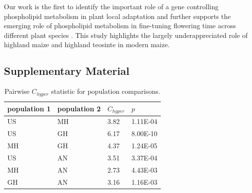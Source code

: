 Our work is the first to identify the important role of a gene controlling phospholipid metabolism in plant local adaptation and further supports the emerging role of phospholipid metabolism in fine-tuning flowering time across different plant species \citep{nakamura2014-qf, susila2021-dz, guo2019-pn}.
This study highlights the largely underappreciated role of highland maize and highland teosinte \mex in modern maize.
\clearpage

\printbibliography[heading=subbibnumbered, title=References]

\clearpage

\begin{subappendices}

\section{Supplementary Material}
\begin{table}[h!]
\centering
\caption{Pairwise $C_{hyper}$ statistic for population comparisons.}
\begin{tabular}{@{}llll@{}}
\toprule
population 1 & population 2 & $C_{hyper}$   & $p$  \\ \midrule
US   & MH   & 3.82 & 1.11E-04 \\
US   & GH   & 6.17 & 8.00E-10 \\
MH   & GH   & 4.37 & 1.24E-05 \\
US   & AN   & 3.51 & 3.37E-04 \\
MH   & AN   & 2.73 & 4.43E-03 \\
GH   & AN   & 3.16 & 1.16E-03 \\ \bottomrule
\end{tabular}
\label{tab:C_hyper}
\end{table}


\end{subappendices}
